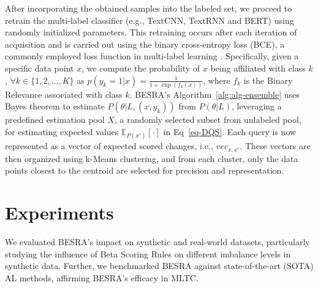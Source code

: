 \documentclass[letterpaper]{article} %
\begin{document}
After incorporating the obtained samples into the labeled set, we proceed to retrain the multi-label classifier (e.g., TextCNN, TextRNN and BERT) using randomly initialized parameters. This retraining occurs after each iteration of acquisition and is carried out using the binary cross-entropy loss (BCE), a commonly employed loss function in multi-label learning \cite{9319440}.
Specifically,
given a specific data point $x$,
we compute the probability of $x$ being affiliated with class $k$,
$\forall k \in \{1, 2, \dots,  K\}$  as
$p(y_k = 1|x) = \frac{1}{1 + \exp(f_k(x))}$,
where $f_k$ is the Binary Relevance associated with class $k$.
BESRA's Algorithm~\ref{alg:alg-ensemble} uses Bayes theorem to estimate $P(\theta|L,(x,y_k))$ from $P(\theta|L)$, leveraging a predefined estimation pool $X$, a randomly selected subset from unlabeled pool, for estimating expected values $\mathbb{E}_{ P(x')}
[\cdot]$ in Eq~\eqref{eq-DQS}.
Each query is now represented as a vector of expected scored changes, i.e.,
$vec_{x,x'}$.
These vectors are then organized using k-Means clustering, and from each cluster, only the data points closest to the centroid are selected for precision and representation.






\section{Experiments}
\label{sec:experiment}

We evaluated BESRA's impact on synthetic and real-world datasets, particularly studying the influence of Beta Scoring Rules on different imbalance levels in synthetic data. Further, we benchmarked BESRA against state-of-the-art (SOTA) AL methods, affirming BESRA's efficacy in MLTC.

\end{document}
